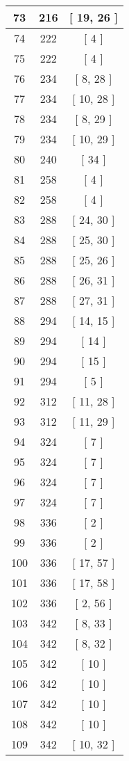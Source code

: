 \begin{center}
\begin{longtable}[H]{|| c c c ||}
\hline
73 & 216 & [ 19, 26 ] \\ 
\hline
74 & 222 & [ 4 ] \\ 
\hline
75 & 222 & [ 4 ] \\ 
\hline
76 & 234 & [ 8, 28 ] \\ 
\hline
77 & 234 & [ 10, 28 ] \\ 
\hline
78 & 234 & [ 8, 29 ] \\ 
\hline
79 & 234 & [ 10, 29 ] \\ 
\hline
80 & 240 & [ 34 ] \\ 
\hline
81 & 258 & [ 4 ] \\ 
\hline
82 & 258 & [ 4 ] \\ 
\hline
83 & 288 & [ 24, 30 ] \\ 
\hline
84 & 288 & [ 25, 30 ] \\ 
\hline
85 & 288 & [ 25, 26 ] \\ 
\hline
86 & 288 & [ 26, 31 ] \\ 
\hline
87 & 288 & [ 27, 31 ] \\ 
\hline
88 & 294 & [ 14, 15 ] \\ 
\hline
89 & 294 & [ 14 ] \\ 
\hline
90 & 294 & [ 15 ] \\ 
\hline
91 & 294 & [ 5 ] \\ 
\hline
92 & 312 & [ 11, 28 ] \\ 
\hline
93 & 312 & [ 11, 29 ] \\ 
\hline
94 & 324 & [ 7 ] \\ 
\hline
95 & 324 & [ 7 ] \\ 
\hline
96 & 324 & [ 7 ] \\ 
\hline
97 & 324 & [ 7 ] \\ 
\hline
98 & 336 & [ 2 ] \\ 
\hline
99 & 336 & [ 2 ] \\ 
\hline
100 & 336 & [ 17, 57 ] \\ 
\hline
101 & 336 & [ 17, 58 ] \\ 
\hline
102 & 336 & [ 2, 56 ] \\ 
\hline
103 & 342 & [ 8, 33 ] \\ 
\hline
104 & 342 & [ 8, 32 ] \\ 
\hline
105 & 342 & [ 10 ] \\ 
\hline
106 & 342 & [ 10 ] \\ 
\hline
107 & 342 & [ 10 ] \\ 
\hline
108 & 342 & [ 10 ] \\ 
\hline
109 & 342 & [ 10, 32 ] \\ 

\end{longtable}
\end{center}
